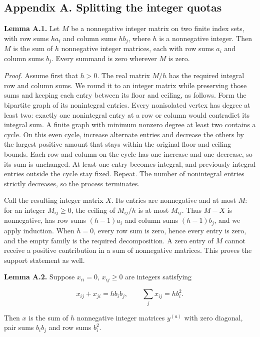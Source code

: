 \documentclass[english,11pt,a4paper]{article}
\begin{document}
\subsection{Appendix A. Splitting the integer quotas}\label{appendix-a.-splitting-the-integer-quotas}

\textbf{Lemma A.1.} Let \(M\) be a nonnegative integer matrix on two finite index sets, with row sums \(h a_i\) and column sums \(h b_j\), where \(h\) is a nonnegative integer. Then \(M\) is the sum of \(h\) nonnegative integer matrices, each with row sums \(a_i\) and column sums \(b_j\). Every summand is zero wherever \(M\) is zero.

\emph{Proof.} Assume first that \(h>0\). The real matrix \(M/h\) has the required integral row and column sums. We round it to an integer matrix while preserving those sums and keeping each entry between its floor and ceiling, as follows. Form the bipartite graph of its nonintegral entries. Every nonisolated vertex has degree at least two: exactly one nonintegral entry at a row or column would contradict its integral sum. A finite graph with minimum nonzero degree at least two contains a cycle. On this even cycle, increase alternate entries and decrease the others by the largest positive amount that stays within the original floor and ceiling bounds. Each row and column on the cycle has one increase and one decrease, so its sum is unchanged. At least one entry becomes integral, and previously integral entries outside the cycle stay fixed. Repeat. The number of nonintegral entries strictly decreases, so the process terminates.

Call the resulting integer matrix \(X\). Its entries are nonnegative and at most \(M\): for an integer \(M_{ij}\ge0\), the ceiling of \(M_{ij}/h\) is at most \(M_{ij}\). Thus \(M-X\) is nonnegative, has row sums \((h-1)a_i\) and column sums \((h-1)b_j\), and we apply induction. When \(h=0\), every row sum is zero, hence every entry is zero, and the empty family is the required decomposition. A zero entry of \(M\) cannot receive a positive contribution in a sum of nonnegative matrices. This proves the support statement as well.

\textbf{Lemma A.2.} Suppose \(x_{ii}=0\), \(x_{ij}\ge0\) are integers satisfying

\[x_{ij}+x_{ji}=h b_ib_j,\qquad \sum_j x_{ij}=h b_i^2.\]

Then \(x\) is the sum of \(h\) nonnegative integer matrices \(y^{(a)}\) with zero diagonal, pair sums \(b_ib_j\) and row sums \(b_i^2\).
\end{document}
